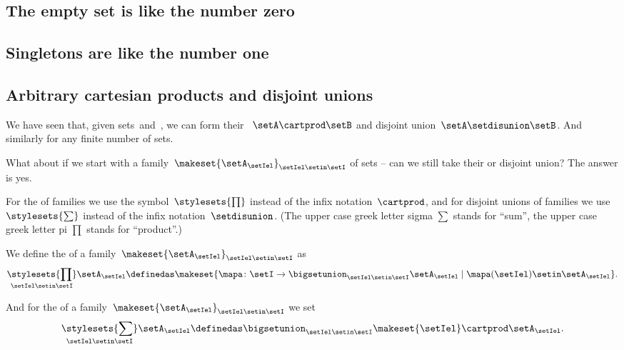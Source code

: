 \subsection{The empty set is like the number zero}


\subsection{Singletons are like the number one}


\subsection{Arbitrary cartesian products and disjoint unions}

We have seen that, given sets~\setA and~\setB, we can form their ~$\setA \cartprod \setB$ and disjoint union~$\setA \setdisunion \setB$.
And similarly for any finite number of sets.

What about if we start with a family~$\makeset{ \setA_\setIel }_{\setIel \setin\setI}$ of sets -- can we still take their  or disjoint union?
The answer is yes.

For the  of families we use the symbol~$\stylesets{\prod}$ instead of the infix notation~$\cartprod$, and for disjoint unions of families we use~$\stylesets{\sum}$ instead of the infix notation~$\setdisunion$.
(The upper case greek letter sigma $\sum$ stands for ``sum'', the upper case greek letter pi $\prod$ stands for ``product''.)

We define the  of a family~$\makeset{ \setA_{\setIel} }_{\setIel \setin\setI}$ as
\begin{equation}
    \underset{\setIel \setin\setI}{\stylesets{\prod}} \setA_{\setIel} \definedas \makeset{ \mapa \colon \setI \to \bigsetunion_{\setIel \setin\setI } \setA_{\setIel} \mid \mapa(\setIel) \setin\setA_{\setIel}}.
\end{equation}

And for the  of a family~$\makeset{ \setA_{\setIel} }_{\setIel \setin\setI}$ we set
\begin{equation}
    \underset{\setIel \setin\setI}{\stylesets{\sum}} \setA_{\setIel} \definedas \bigsetunion_{\setIel \setin\setI} \makeset{ \setIel } \cartprod \setA_{\setIel}.
\end{equation}

